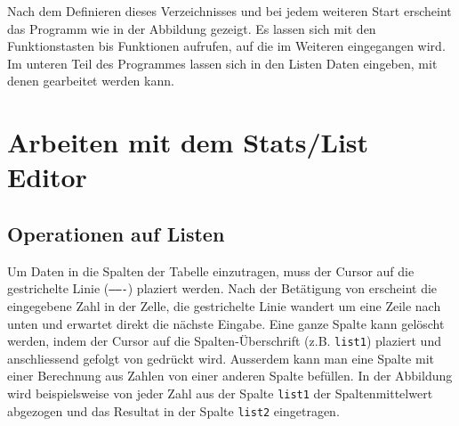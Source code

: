 \documentclass[a4paper,11pt,notitlepage,halfparskip,headsepline,normalheadings,twoside]{scrartcl}
\newlength{\tikey}
\newcommand{\keystroke}[1]{\settowidth{\tikey}{\scriptsize #1}\psframebox[framearc=0.2]{\parbox{\tikey}{\scriptsize\textsf{#1}}}}
\begin{document}
\begin{window}
Nach dem Definieren dieses Verzeichnisses und bei jedem weiteren Start erscheint
das Programm wie in der Abbildung gezeigt. Es lassen sich mit den
Funktionstasten \keystroke{F1} bis \keystroke{F7} Funktionen aufrufen, auf die
im Weiteren eingegangen wird. Im unteren Teil des Programmes lassen sich in den
Listen Daten eingeben, mit denen gearbeitet werden kann.
\end{window}

\section{Arbeiten mit dem Stats/List Editor}

\subsection{Operationen auf Listen}
\begin{window}
Um Daten in die Spalten der Tabelle einzutragen, muss der Cursor auf die
gestrichelte Linie (\texttt{-------}) plaziert werden. Nach der Betätigung von
\keystroke{ENTER} erscheint die eingegebene Zahl in der Zelle,
die gestrichelte Linie wandert um eine Zeile nach unten und erwartet direkt die
nächste Eingabe. Eine ganze Spalte kann gelöscht werden, indem der Cursor auf
die Spalten-Überschrift (z.B. \texttt{list1}) plaziert und anschliessend
\keystroke{CLEAR} gefolgt von \keystroke{ENTER} gedrückt wird. Ausserdem kann man eine
Spalte mit einer Berechnung aus Zahlen von einer anderen Spalte befüllen. In der
Abbildung wird beispielsweise von jeder Zahl aus der Spalte \texttt{list1} der
Spaltenmittelwert abgezogen und das Resultat in der Spalte \texttt{list2}
eingetragen.
\end{window}
\end{document}

